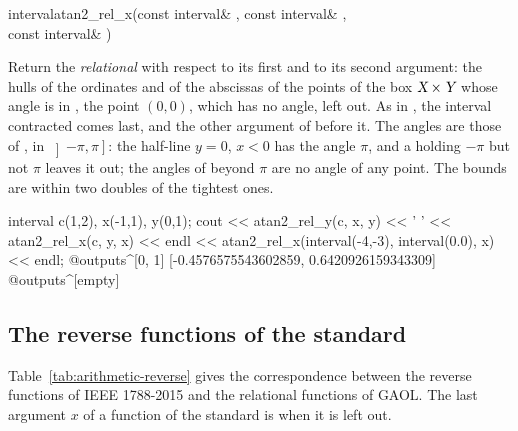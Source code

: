 \documentclass[12pt,a4paper,twoside,openright]{book}
\begin{document}
\begin{deffun}{interval}{atan2\_rel\_x}{(const interval\& , const interval\& , \\\hbox{}\hfill const interval\& )}
  \begin{operation}
  \end{operation}
  Return the \emph{relational}  with respect to its first and to
  its second argument: the hulls of the ordinates and of the abscissas of
  the points of the box $\textsl{X}\times\textsl{Y}$ whose angle is in ,
  the point $(0,0)$, which has no angle, left out.\newinvfive{} As in
  , the interval contracted comes last, and the other
  argument of  before it. The angles are those of ,
  in $\left]-\pi,\pi\right]$: the half-line $y=0$, $x<0$ has the angle
  $\pi$, and a  holding $-\pi$ but not $\pi$ leaves it out; the
  angles of  beyond $\pi$ are no angle of any point. The bounds are
  within two doubles of the tightest ones.
\begin{example}
interval c(1,2), x(-1,1), y(0,1);
cout << atan2_rel_y(c, x, y) << ' '
     << atan2_rel_x(c, y, x) << endl
     << atan2_rel_x(interval(-4,-3), interval(0.0), x)
     << endl;
@outputs^[0, 1] [-0.4576575543602859, 0.6420926159343309]~
@outputs^[empty]~
\end{example}
\end{deffun}

\subsection{The reverse functions of the standard}
\label{sec:arithmetic-reverse-names}

Table~\ref{tab:arithmetic-reverse} gives the correspondence between the
reverse functions of IEEE 1788-2015 and the relational functions of GAOL.
The last argument $x$ of a function of the standard is
\itv{-\infty}{+\infty} when it is left out.
\end{document}
